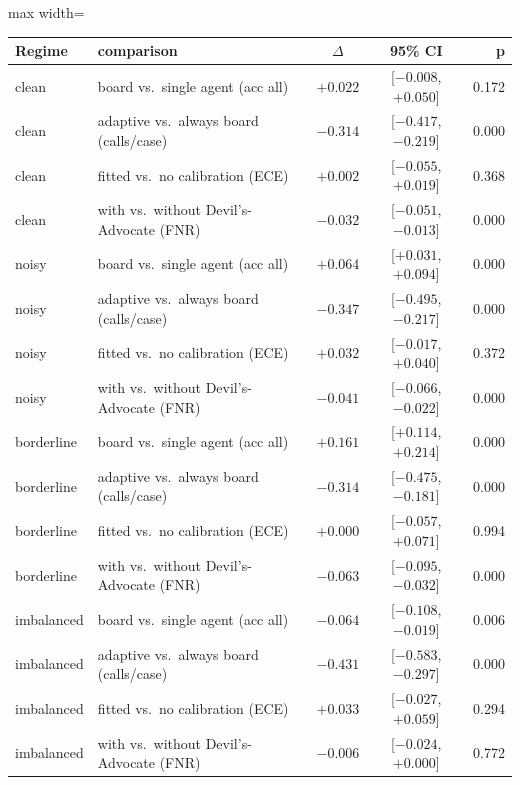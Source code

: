 \documentclass[12pt]{article}
\begin{document}
\begin{table}[htbp]
\centering
\small
\renewcommand{\arraystretch}{1.25}
\setlength{\tabcolsep}{5pt}
\begin{adjustbox}{max width=\linewidth}
\begin{tabular}{|l|l|c|c|r|}
\hline
\rowcolor{tblhead}
\textbf{Regime} & \textbf{comparison} & \textbf{$\Delta$} & \textbf{95\% CI} & \textbf{p} \\ \hline
clean & board vs.\ single agent (acc all) & $+0.022$ & [$-0.008$, $+0.050$] & 0.172 \\
\hline
clean & adaptive vs.\ always board (calls/case) & $-0.314$ & [$-0.417$, $-0.219$] & 0.000 \\
\hline
clean & fitted vs.\ no calibration (ECE) & $+0.002$ & [$-0.055$, $+0.019$] & 0.368 \\
\hline
clean & with vs.\ without Devil's-Advocate (FNR) & $-0.032$ & [$-0.051$, $-0.013$] & 0.000 \\
\hline
noisy & board vs.\ single agent (acc all) & $+0.064$ & [$+0.031$, $+0.094$] & 0.000 \\
\hline
noisy & adaptive vs.\ always board (calls/case) & $-0.347$ & [$-0.495$, $-0.217$] & 0.000 \\
\hline
noisy & fitted vs.\ no calibration (ECE) & $+0.032$ & [$-0.017$, $+0.040$] & 0.372 \\
\hline
noisy & with vs.\ without Devil's-Advocate (FNR) & $-0.041$ & [$-0.066$, $-0.022$] & 0.000 \\
\hline
borderline & board vs.\ single agent (acc all) & $+0.161$ & [$+0.114$, $+0.214$] & 0.000 \\
\hline
borderline & adaptive vs.\ always board (calls/case) & $-0.314$ & [$-0.475$, $-0.181$] & 0.000 \\
\hline
borderline & fitted vs.\ no calibration (ECE) & $+0.000$ & [$-0.057$, $+0.071$] & 0.994 \\
\hline
borderline & with vs.\ without Devil's-Advocate (FNR) & $-0.063$ & [$-0.095$, $-0.032$] & 0.000 \\
\hline
imbalanced & board vs.\ single agent (acc all) & $-0.064$ & [$-0.108$, $-0.019$] & 0.006 \\
\hline
imbalanced & adaptive vs.\ always board (calls/case) & $-0.431$ & [$-0.583$, $-0.297$] & 0.000 \\
\hline
imbalanced & fitted vs.\ no calibration (ECE) & $+0.033$ & [$-0.027$, $+0.059$] & 0.294 \\
\hline
imbalanced & with vs.\ without Devil's-Advocate (FNR) & $-0.006$ & [$-0.024$, $+0.000$] & 0.772 \\

\end{tabular}
\end{adjustbox}
\end{table}
\end{document}
